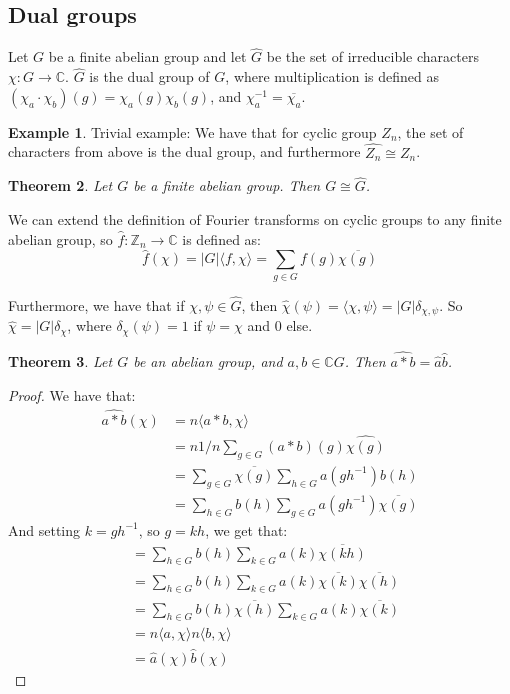 \documentclass[]{article}
\newtheorem{theorem}{Theorem}
\theoremstyle{definition}
\newtheorem{example}[theorem]{Example}
\numberwithin{theorem}{section}
\numberwithin{equation}{section}
\begin{document}
\subsection{Dual groups}
Let $G$ be a finite abelian group and let $\widehat{G}$ be the set of irreducible characters $\chi: G \rightarrow \mathbb{C}$. $\widehat{G}$ is the dual group of $G$, where multiplication is defined as $(\chi_a \cdot \chi_b)(g) = \chi_a(g)\chi_b(g)$, and $\chi_a^{-1} = \overline{\chi_a}$. 

\begin{example}
	Trivial example: We have that for cyclic group $Z_n$, the set of characters from above is the dual group, and furthermore $\widehat{Z_n} \cong Z_n$. 
\end{example}

\begin{theorem}
	Let $G$ be a finite abelian group. Then $G \cong \widehat{G}$.
\end{theorem}

We can extend the definition of Fourier transforms on cyclic groups to any finite abelian group, so $\widehat{f}: \mathbb{Z}_n \rightarrow \mathbb{C}$ is defined as:
\begin{equation}
	\widehat{f}(\chi) = |G| \langle f, \chi \rangle = \sum_{g \in G} f(g) \overline{\chi(g)}
\end{equation}

Furthermore, we have that if $\chi, \psi \in \widehat{G}$, then $\widehat{\chi}(\psi) = \langle \chi, \psi \rangle = |G|\delta_{\chi, \psi}$. So $\widehat{\chi} = |G| \delta_{\chi}$, where $\delta_{\chi}(\psi) = 1$ if $\psi = \chi$ and 0 else. 

\begin{theorem}
	\label{thm:abelian dual commutation}
	Let $G$ be an abelian group, and $a, b \in \mathbb{C}G$. Then $ \widehat{a \ast b} = \widehat{a} \widehat{b}$. 
\end{theorem}

\begin{proof}
	We have that:
\begin{align*}
		\widehat{a \ast b}(\chi) &= n \langle a \ast b, \chi \rangle\\
		&= n 1/n \sum_{g \in G} (a \ast b) (g) \widehat{\chi(g)} \\
		&= \sum_{g \in G} \overline{\chi(g)} 
		\sum_{h \in G} a(g h^{-1}) b(h) \\
		&= \sum_{h \in G} b(h)  
		\sum_{g \in G} a(g h^{-1})\overline{\chi(g)}  
\end{align*} 
And setting $k = gh^{-1}$, so $g =kh$, we get that:
\begin{align*}
		&= \sum_{h \in G} b(h)  
		\sum_{k \in G} a(k)\overline{\chi(kh)} \\
		&= \sum_{h \in G} b(h)  
		\sum_{k \in G} a(k)\overline{\chi(k)} \overline{\chi(h)} \\
		&=  \sum_{h \in G} b(h)  \overline{\chi(h)} 
		\sum_{k \in G} a(k)\overline{\chi(k)}\\
		&= n \langle a, \chi \rangle n \langle b, \chi \rangle\\
		&= \widehat{a}(\chi) \widehat{b}(\chi)
\end{align*}
\end{proof}
\end{document}
